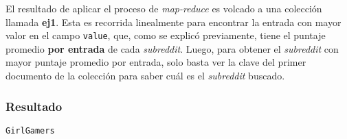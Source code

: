 \documentclass[a4paper]{article}
\begin{document}
El resultado de aplicar el proceso de \textit{map-reduce} es volcado a una
colección llamada \textbf{ej1}. Esta es recorrida linealmente para encontrar la
entrada con mayor valor en el campo \verb|value|, que, como se explicó
previamente, tiene el puntaje promedio \textbf{por entrada} de cada
\textit{subreddit}. Luego, para obtener el \textit{subreddit} con mayor puntaje
promedio por entrada, solo basta ver la clave del primer documento de la
colección para saber cuál es el \textit{subreddit} buscado.

\subsubsection{Resultado}
\begin{verbatim}
GirlGamers
\end{verbatim}
\end{document}
